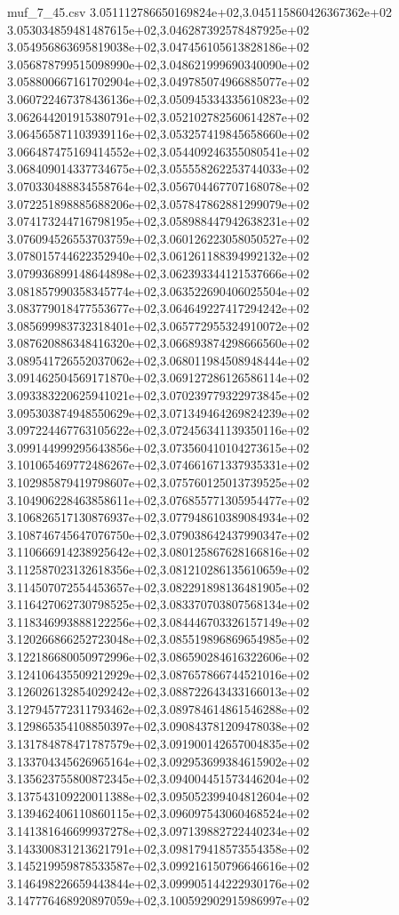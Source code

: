 \begin{filecontents*}{muf_7_45.csv}
3.051112786650169824e+02,3.045115860426367362e+02
3.053034859481487615e+02,3.046287392578487925e+02
3.054956863695819038e+02,3.047456105613828186e+02
3.056878799515098990e+02,3.048621999690340090e+02
3.058800667161702904e+02,3.049785074966885077e+02
3.060722467378436136e+02,3.050945334335610823e+02
3.062644201915380791e+02,3.052102782560614287e+02
3.064565871103939116e+02,3.053257419845658660e+02
3.066487475169414552e+02,3.054409246355080541e+02
3.068409014337734675e+02,3.055558262253744033e+02
3.070330488834558764e+02,3.056704467707168078e+02
3.072251898885688206e+02,3.057847862881299079e+02
3.074173244716798195e+02,3.058988447942638231e+02
3.076094526553703759e+02,3.060126223058050527e+02
3.078015744622352940e+02,3.061261188394992132e+02
3.079936899148644898e+02,3.062393344121537666e+02
3.081857990358345774e+02,3.063522690406025504e+02
3.083779018477553677e+02,3.064649227417294242e+02
3.085699983732318401e+02,3.065772955324910072e+02
3.087620886348416320e+02,3.066893874298666560e+02
3.089541726552037062e+02,3.068011984508948444e+02
3.091462504569171870e+02,3.069127286126586114e+02
3.093383220625941021e+02,3.070239779322973845e+02
3.095303874948550629e+02,3.071349464269824239e+02
3.097224467763105622e+02,3.072456341139350116e+02
3.099144999295643856e+02,3.073560410104273615e+02
3.101065469772486267e+02,3.074661671337935331e+02
3.102985879419798607e+02,3.075760125013739525e+02
3.104906228463858611e+02,3.076855771305954477e+02
3.106826517130876937e+02,3.077948610389084934e+02
3.108746745647076750e+02,3.079038642437990347e+02
3.110666914238925642e+02,3.080125867628166816e+02
3.112587023132618356e+02,3.081210286135610659e+02
3.114507072554453657e+02,3.082291898136481905e+02
3.116427062730798525e+02,3.083370703807568134e+02
3.118346993888122256e+02,3.084446703326157149e+02
3.120266866252723048e+02,3.085519896869654985e+02
3.122186680050972996e+02,3.086590284616322606e+02
3.124106435509212929e+02,3.087657866744521016e+02
3.126026132854029242e+02,3.088722643433166013e+02
3.127945772311793462e+02,3.089784614861546288e+02
3.129865354108850397e+02,3.090843781209478038e+02
3.131784878471787579e+02,3.091900142657004835e+02
3.133704345626965164e+02,3.092953699384615902e+02
3.135623755800872345e+02,3.094004451573446204e+02
3.137543109220011388e+02,3.095052399404812604e+02
3.139462406110860115e+02,3.096097543060468524e+02
3.141381646699937278e+02,3.097139882722440234e+02
3.143300831213621791e+02,3.098179418573554358e+02
3.145219959878533587e+02,3.099216150796646616e+02
3.146498226659443844e+02,3.099905144222930176e+02
3.147776468920897059e+02,3.100592902915986997e+02

\end{filecontents*}
